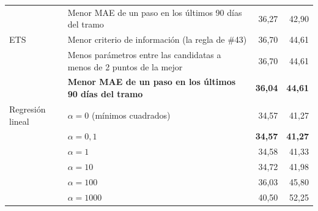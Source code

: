 {\begin{longtable}{@{}>{\raggedright\arraybackslash}p{3.2cm}>{\raggedright\arraybackslash}p{7.4cm}rr@{}}
 & Menor MAE de un paso en los últimos 90 días del tramo & 36,27 & 42,90 \\
\addlinespace
ETS & Menor criterio de información (la regla de \#43) & 36,70 & 44,61 \\
 & Menos parámetros entre las candidatas a menos de 2 puntos de la mejor & 36,70 & 44,61 \\
 & \textbf{Menor MAE de un paso en los últimos 90 días del tramo} & \textbf{36,04} & \textbf{44,61} \\
\addlinespace
Regresión lineal & $\alpha = 0$ (mínimos cuadrados) & 34,57 & 41,27 \\
 & \boldmath$\alpha = 0{,}1$ & \textbf{34,57} & \textbf{41,27} \\
 & $\alpha = 1$ & 34,58 & 41,33 \\
 & $\alpha = 10$ & 34,72 & 41,98 \\
 & $\alpha = 100$ & 36,03 & 45,80 \\
 & $\alpha = 1000$ & 40,50 & 52,25 \\
\end{longtable}
}
